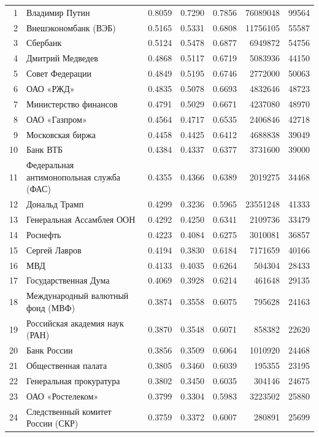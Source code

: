 {\begin{longtable}{r >{\raggedright\arraybackslash}p{4.2cm} S[table-format=1.4] S[table-format=1.4] S[table-format=1.4] r r}
1 & Владимир Путин & 0.8059 & 0.7290 & 0.7856 & 76089048 & 99564 \\
2 & Внешэкономбанк (ВЭБ) & 0.5165 & 0.5331 & 0.6808 & 11756105 & 55587 \\
3 & Сбербанк & 0.5124 & 0.5478 & 0.6877 & 6949872 & 54756 \\
4 & Дмитрий Медведев & 0.4868 & 0.5117 & 0.6719 & 5083936 & 44150 \\
5 & Совет Федерации & 0.4849 & 0.5195 & 0.6746 & 2772000 & 50063 \\
6 & ОАО «РЖД» & 0.4835 & 0.5078 & 0.6693 & 4832646 & 48723 \\
7 & Министерство финансов & 0.4791 & 0.5029 & 0.6671 & 4237080 & 48970 \\
8 & ОАО «Газпром» & 0.4564 & 0.4717 & 0.6535 & 2406846 & 42718 \\
9 & Московская биржа & 0.4458 & 0.4425 & 0.6412 & 4688838 & 39049 \\
10 & Банк ВТБ & 0.4384 & 0.4337 & 0.6377 & 3731600 & 39000 \\
11 & Федеральная антимонопольная служба (ФАС) & 0.4355 & 0.4366 & 0.6389 & 2019275 & 34468 \\
12 & Дональд Трамп & 0.4299 & 0.3236 & 0.5965 & 23551248 & 41333 \\
13 & Генеральная Ассамблея ООН & 0.4292 & 0.4250 & 0.6341 & 2109736 & 33479 \\
14 & Роснефть & 0.4223 & 0.4084 & 0.6275 & 3010081 & 36857 \\
15 & Сергей Лавров & 0.4194 & 0.3830 & 0.6184 & 7171659 & 40166 \\
16 & МВД & 0.4133 & 0.4035 & 0.6264 & 504304 & 28433 \\
17 & Государственная Дума & 0.4069 & 0.3928 & 0.6214 & 461648 & 29135 \\
18 & Международный валютный фонд (МВФ) & 0.3874 & 0.3558 & 0.6075 & 795628 & 24163 \\
19 & Российская академия наук (РАН) & 0.3870 & 0.3548 & 0.6071 & 858382 & 22620 \\
20 & Банк России & 0.3856 & 0.3509 & 0.6064 & 1010920 & 24468 \\
21 & Общественная палата & 0.3805 & 0.3460 & 0.6039 & 195355 & 23195 \\
22 & Генеральная прокуратура & 0.3802 & 0.3450 & 0.6035 & 304146 & 24675 \\
23 & ОАО «Ростелеком» & 0.3799 & 0.3304 & 0.5983 & 3223502 & 25880 \\
24 & Следственный комитет России (СКР) & 0.3759 & 0.3372 & 0.6007 & 280891 & 25699 \\

\end{longtable}}
